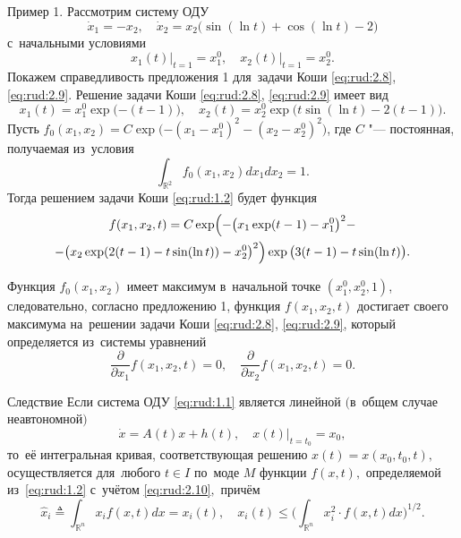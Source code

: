 {\small \sc Пример 1.}
 Рассмотрим систему ОДУ
\begin{equation}
\dot x_1=-x_2,\quad \dot x_2=x_2\bigl(\sin(\ln t)+\cos(\ln t)-2\bigr)\label{eq:rud:2.8}
\end{equation}
с~начальными условиями
\begin{equation}
x_1(t)\big|_{t=1}=x_1^0,\quad x_2(t)\big|_{t=1}=x_2^0.\label{eq:rud:2.9}
\end{equation}
Покажем справедливость предложения 1 для~задачи Коши \eqref{eq:rud:2.8}, \eqref{eq:rud:2.9}. 
Решение задачи Коши
\eqref{eq:rud:2.8}, \eqref{eq:rud:2.9} имеет вид
$$
x_1(t)=x_1^0\exp\bigl({-(t-1)}\bigr),\quad  x_2(t)=x_2^0\exp\bigl({t \sin(\ln t)-2(t-1)}\bigr).
$$
Пусть $f_0(x_1,x_2)=C\exp \bigl({-(x_1-x_1^0)^2-(x_2-x_2^0)^2}\bigr)$, где
$C$ "--- постоянная, получаемая из~условия
$$
\int _{\mathbb R^2}f_0(x_1,x_2)dx_1dx_2=1.
$$
Тогда решением задачи Коши \eqref{eq:rud:1.2} будет функция
\begin{multline*}
f(x_1,x_2,t)=C\exp\Bigl(-\bigl(x_1 \exp({t-1})-x_1^0\bigr)^2- \\ 
-\bigl(x_2\exp({2(t-1)-t\sin(\ln t)})-x_2^0\bigr)^2\Bigr) \exp{\bigl(3(t-1)-t\sin(\ln t)\bigr)}.
\end{multline*}

Функция $f_0(x_1,x_2)$ имеет максимум в~начальной точке
$(x_1^0,x_2^0,1)$, следовательно, согласно предложению 1, функция
$f(x_1,x_2,t)$ достигает своего максимума на~решении задачи Коши
\eqref{eq:rud:2.8}, \eqref{eq:rud:2.9}, который определяется
из~системы уравнений
$$
\frac{\partial}{\partial
x_1}f(x_1,x_2,t)=0,\quad \frac{\partial}{\partial x_2}f(x_1,x_2,t)=0.
$$

\smallskip

\begin{newthm}{Следствие}
 Если система ОДУ \eqref{eq:rud:1.1} является линейной $($в~общем случае неавтономной\/$)$
\begin{equation}
\dot x=A(t)x+h(t),\quad  x(t)\big|_{t=t_0}=x_0,\label{eq:rud:2.10}
\end{equation}
то~её интегральная кривая, соответствующая решению $x(t)=x(x_0,t_0,t),$ осуществляется для~любого $t\in I$ по~моде
$M$ функции $f(x,t),$ определяемой из~\eqref{eq:rud:1.2} с~учётом
\eqref{eq:rud:2.10}$,$ причём
$$
\hat x_i\triangleq \int _{\mathbb R^n}x_i f(x,t)dx=x_i(t),\quad 
x_i(t)\le\biggl(\int _{\mathbb R^n}x_i^2\cdot f(x,t)dx\biggr)^{1/2}.
$$
\end{newthm}

\smallskip

